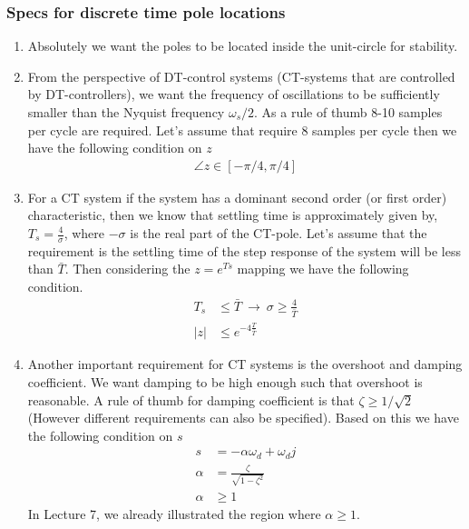\documentclass[twoside]{article}
\begin{document}
\subsubsection*{Specs for discrete time pole locations}

\begin{enumerate}
  \item Absolutely we want the poles to be located inside the
    unit-circle for stability. 
  \item From the perspective of DT-control systems (CT-systems that are controlled by
    DT-controllers), we want the frequency of oscillations to 
    be sufficiently smaller than the Nyquist frequency $\omega_s / 2$.
    As a rule of thumb 8-10 samples per cycle are required. 
    Let's assume that require 8 samples per cycle then we have the
    following condition on $z$
%
     \begin{align*}
      \angle z \in [-\pi/4 , \pi/4]
     \end{align*}
%
    \item For a CT system if the system has a dominant second order
      (or first order) characteristic, then we know that settling time
      is approximately given by, $T_s = \frac{4}{\sigma}$, where
      $-\sigma$ is the real part of the CT-pole. Let's assume that
      the requirement is the settling time of the step response of the
     system will be less than $\bar{T}$. Then considering the $z =
     e^{Ts}$ mapping we have the following condition.
%
     \begin{align*}
       T_s &\leq \bar{T} \ \rightarrow \ \sigma \geq \frac{4}{\bar{T}}
       \\
       | z | &\leq e^{-4 \frac{T}{\bar{T}}}  
     \end{align*}
%
   \item Another important requirement for CT systems is the overshoot
     and damping coefficient. We want damping to be high enough such 
     that overshoot is reasonable. A rule of thumb for damping
     coefficient is that $\zeta \geq 1/\sqrt{2}$ (However different 
    requirements can also be specified). Based on this we have the
    following condition on $s$
%
     \begin{align*}
       s &= -\alpha \omega_d + \omega_d j 
           \\
       \alpha &= \frac{\zeta}{\sqrt{1 - \zeta^2}}
                \\
       \alpha &\geq 1
     \end{align*}
%
 In Lecture 7, we already illustrated the region where $\alpha \geq
 1$.
\end{enumerate}
\end{document}
